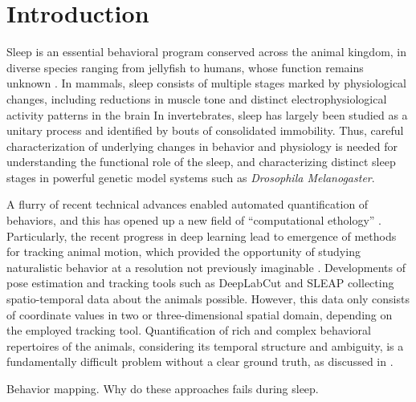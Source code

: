 \setlength{\parindent}{0pt}
\chapter{Introduction}\label{chapter:introduction}
Sleep is an essential behavioral program conserved across the animal kingdom, in diverse species ranging from jellyfish to humans, whose function remains unknown \citep{campbell_animal_1984, nath_jellyfish_2017}.
In mammals, sleep consists of multiple stages marked by physiological changes, including reductions in muscle tone and distinct electrophysiological activity patterns in the brain \citep{corner_sleep_1977, sauer_dynamics_2003} In invertebrates, sleep has largely been studied as a unitary process and identified by bouts of consolidated immobility.
Thus, careful characterization of underlying changes in behavior and physiology is needed for understanding the functional role of the sleep, and characterizing distinct sleep stages in powerful genetic model systems such as \textit{Drosophila Melanogaster}.

A flurry of recent technical advances enabled automated quantification of behaviors, and this has opened up a new field of ``computational ethology'' \citep{anderson_toward_2014, datta_computational_2019}.
Particularly, the recent progress in deep learning lead to emergence of  methods for tracking animal motion, which provided the opportunity of studying naturalistic behavior at a resolution not previously imaginable \citep{pereira_quantifying_2020}.
Developments of pose estimation and tracking tools such as DeepLabCut \citep{mathis_deeplabcut_2018} and SLEAP \citep{pereira_fast_2019, pereira_sleap_2022} collecting spatio-temporal data about the animals possible.
However, this data only consists of coordinate values in two or three-dimensional spatial domain, depending on the employed tracking tool.
Quantification of rich and complex behavioral repertoires of the animals, considering its temporal structure and ambiguity, is a fundamentally difficult problem without a clear ground truth, as discussed in \citet{pereira_quantifying_2020}.

Behavior mapping.
Why do these approaches fails during sleep.

